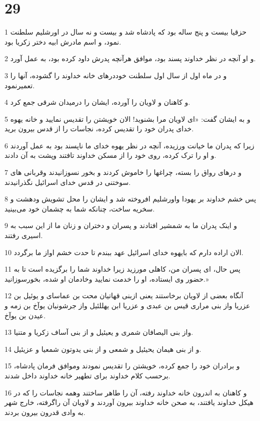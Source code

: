 \chapter{29}

\par 1 حزقیا بیست و پنج ساله بود که پادشاه شد و بیست و نه سال در اورشلیم سلطنت نمود، و اسم مادرش ابیه دختر زکریا بود.
\par 2 و او آنچه در نظر خداوند پسند بود، موافق هرآنچه پدرش داود کرده بود، به عمل آورد.
\par 3 و در ماه اول از سال اول سلطنت خوددرهای خانه خداوند را گشوده، آنها را تعمیرنمود.
\par 4 و کاهنان و لاویان را آورده، ایشان را درمیدان شرقی جمع کرد.
\par 5 و به ایشان گفت: «ای لاویان مرا بشنوید! الان خویشتن را تقدیس نمایید و خانه یهوه خدای پدران خود را تقدیس کرده، نجاسات را از قدس بیرون برید.
\par 6 زیرا که پدران ما خیانت ورزیده، آنچه در نظر یهوه خدای ما ناپسند بود به عمل آوردند و او را ترک کرده، روی خود را از مسکن خداوند تافتند وپشت به آن دادند.
\par 7 و درهای رواق را بسته، چراغها را خاموش کردند و بخور نسوزانیدند وقربانی های سوختنی در قدس خدای اسرائیل نگذرانیدند.
\par 8 پس خشم خداوند بر یهودا واورشلیم افروخته شد و ایشان را محل تشویش ودهشت و سخریه ساخت، چنانکه شما به چشمان خود می‌بینید.
\par 9 و اینک پدران ما به شمشیر افتادند و پسران و دختران و زنان ما از این سبب به اسیری رفتند.
\par 10 الان اراده دارم که بایهوه خدای اسرائیل عهد ببندم تا حدت خشم اواز ما برگردد.
\par 11 پس حال، ای پسران من، کاهلی مورزید زیرا خداوند شما را برگزیده است تا به حضور وی ایستاده، او را خدمت نمایید وخادمان او شده، بخور‌سوزانید.»
\par 12 آنگاه بعضی از لاویان برخاستند یعنی ازبنی قهاتیان محت بن عماسای و یوئیل بن عزریا واز بنی مراری قیس بن عبدی و عزریا ابن یهللئیل واز جرشونیان یوآخ بن زمه و عیدن بن یوآخ.
\par 13 واز بنی الیصافان شمری و یعیئیل و از بنی آساف زکریا و متنیا.
\par 14 و از بنی هیمان یحیئیل و شمعی و از بنی یدوتون شمعیا و عزیئیل.
\par 15 و برادران خود را جمع کرده، خویشتن را تقدیس نمودند وموافق فرمان پادشاه، برحسب کلام خداوند برای تطهیر خانه خداوند داخل شدند.
\par 16 و کاهنان به اندرون خانه خداوند رفته، آن را طاهر ساختند وهمه نجاسات را که در هیکل خداوند یافتند، به صحن خانه خداوند بیرون آوردند و لاویان آن راگرفته، خارج شهر به وادی قدرون بیرون بردند.
